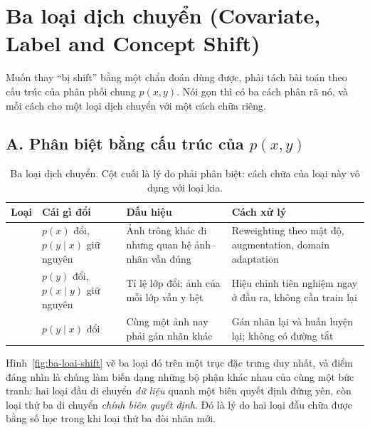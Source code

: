 \documentclass[../../deep_learning.tex]{subfiles}
\begin{document}
\section{Ba loại dịch chuyển (Covariate, Label and Concept Shift)}
Muốn thay ``bị shift'' bằng một chẩn đoán dùng được, phải tách bài toán theo cấu trúc của phân phối chung \(p(x, y)\). Nói gọn thì có ba cách phân rã nó, và mỗi cách cho một loại dịch chuyển với một cách chữa riêng.

\subsection{A. Phân biệt bằng cấu trúc của \(p(x,y)\)}
\begin{table}[H]\centering\footnotesize
\caption{Ba loại dịch chuyển. Cột cuối là lý do phải phân biệt: cách chữa của loại này vô dụng với loại kia.}
\label{tab:ba-loai-shift}
\begin{tabularx}{\linewidth}{@{}L{2.3cm}L{3.0cm}YL{4.0cm}@{}}
\toprule
\textbf{Loại} & \textbf{Cái gì đổi} & \textbf{Dấu hiệu} & \textbf{Cách xử lý}\\
\midrule
{} & \(p(x)\) đổi, \(p(y\mid x)\) giữ nguyên & Ảnh trông khác đi nhưng quan hệ ảnh--nhãn vẫn đúng & Reweighting theo mật độ, augmentation, domain adaptation\\
 & \(p(y)\) đổi, \(p(x\mid y)\) giữ nguyên & Tỉ lệ lớp đổi; ảnh của mỗi lớp vẫn y hệt & Hiệu chỉnh tiên nghiệm ngay ở đầu ra, không cần train lại\\
 & \(p(y\mid x)\) đổi & Cùng một ảnh nay phải gán nhãn khác & Gán nhãn lại và huấn luyện lại; không có đường tắt\\
\bottomrule
\end{tabularx}
\end{table}

Hình~\ref{fig:ba-loai-shift} vẽ ba loại đó trên một trục đặc trưng duy nhất, và điểm đáng nhìn là chúng làm biến dạng những bộ phận khác nhau của cùng một bức tranh: hai loại đầu di chuyển \emph{dữ liệu} quanh một biên quyết định đứng yên, còn loại thứ ba di chuyển \emph{chính biên quyết định}. Đó là lý do hai loại đầu chữa được bằng số học trong khi loại thứ ba đòi nhãn mới.
\end{document}
